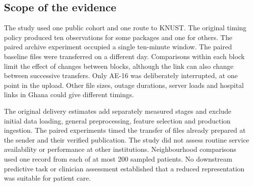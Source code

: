 \subsection{Scope of the evidence}
The study used one public cohort and one route to KNUST. The original timing policy produced ten observations for some packages and one for others. The paired archive experiment occupied a single ten-minute window. The paired baseline files were transferred on a different day. Comparisons within each block limit the effect of changes between blocks, although the link can also change between successive transfers. Only AE-16 was deliberately interrupted, at one point in the upload. Other file sizes, outage durations, server loads and hospital links in Ghana could give different timings.

The original delivery estimates add separately measured stages and exclude initial data loading, general preprocessing, feature selection and production ingestion. The paired experiments timed the transfer of files already prepared at the sender and their verified publication. The study did not assess routine service availability or performance at other institutions. Neighbourhood comparisons used one record from each of at most 200 sampled patients. No downstream predictive task or clinician assessment established that a reduced representation was suitable for patient care.
